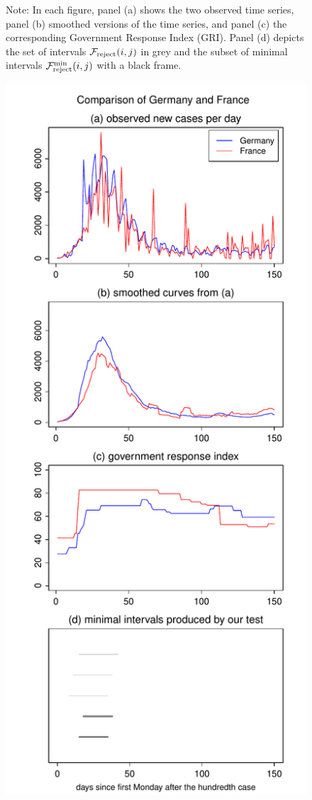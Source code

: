 \documentclass[a4paper,12pt]{article}
\numberwithin{equation}{section}
\begin{document}
\begin{figure}[p!]
\caption*{Note: In each figure, panel (a) shows the two observed time series, panel (b) smoothed versions of the time series, and panel (c) the corresponding Government Response Index (GRI). Panel (d) depicts the set of intervals $\mathcal{F}_{\text{reject}}(i,j)$ in grey and the subset of minimal intervals $\mathcal{F}_{\text{reject}}^{\text{min}}(i,j)$ with a black frame.}
\end{figure}


\begin{figure}[p!]
\begin{minipage}[t]{0.49\textwidth}
\includegraphics[width=\textwidth]{plots/DEU_vs_FRA_Monday}

\end{minipage}
\end{figure}
\end{document}
